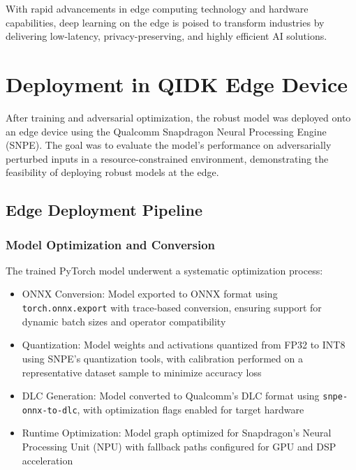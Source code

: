 \documentclass[9pt,a4paper,twoside]{rho-class/rho}
\begin{document}
With rapid advancements in edge computing technology and hardware capabilities, deep learning on the edge is poised to transform industries by delivering low-latency, privacy-preserving, and highly efficient AI solutions.

















\section{Deployment in QIDK Edge Device}
After training and adversarial optimization, the robust model was deployed onto an edge device using the Qualcomm Snapdragon Neural Processing Engine (SNPE). The goal was to evaluate the model's performance on adversarially perturbed inputs in a resource-constrained environment, demonstrating the feasibility of deploying robust models at the edge.


\subsection{Edge Deployment Pipeline}
\subsubsection{Model Optimization and Conversion}
The trained PyTorch model underwent a systematic optimization process:
\begin{itemize}
\item ONNX Conversion: Model exported to ONNX format using \texttt{torch.onnx.export} with trace-based conversion, ensuring support for dynamic batch sizes and operator compatibility
\item Quantization: Model weights and activations quantized from FP32 to INT8 using SNPE's quantization tools, with calibration performed on a representative dataset sample to minimize accuracy loss
\item DLC Generation: Model converted to Qualcomm's DLC format using \texttt{snpe-onnx-to-dlc}, with optimization flags enabled for target hardware
\item Runtime Optimization: Model graph optimized for Snapdragon's Neural Processing Unit (NPU) with fallback paths configured for GPU and DSP acceleration
\end{itemize}
\end{document}
